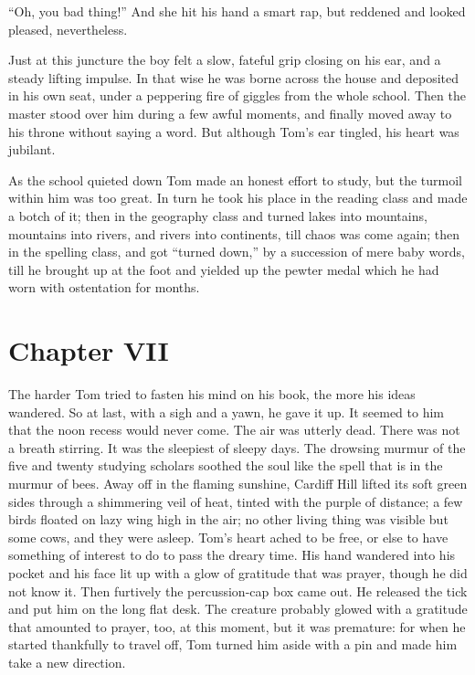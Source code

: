 \documentclass{book}
\begin{document}
“Oh, you bad thing!” And she hit his hand a smart rap, but reddened and looked pleased, nevertheless.

Just at this juncture the boy felt a slow, fateful grip closing on his ear, and a steady lifting impulse. In that wise he was borne across the house and deposited in his own seat, under a peppering fire of giggles from the whole school. Then the master stood over him during a few awful moments, and finally moved away to his throne without saying a word. But although Tom’s ear tingled, his heart was jubilant.

As the school quieted down Tom made an honest effort to study, but the turmoil within him was too great. In turn he took his place in the reading class and made a botch of it; then in the geography class and turned lakes into mountains, mountains into rivers, and rivers into continents, till chaos was come again; then in the spelling class, and got “turned down,” by a succession of mere baby words, till he brought up at the foot and yielded up the pewter medal which he had worn with ostentation for months.

\chapter*{Chapter VII}

The harder Tom tried to fasten his mind on his book, the more his ideas wandered. So at last, with a sigh and a yawn, he gave it up. It seemed to him that the noon recess would never come. The air was utterly dead. There was not a breath stirring. It was the sleepiest of sleepy days. The drowsing murmur of the five and twenty studying scholars soothed the soul like the spell that is in the murmur of bees. Away off in the flaming sunshine, Cardiff Hill lifted its soft green sides through a shimmering veil of heat, tinted with the purple of distance; a few birds floated on lazy wing high in the air; no other living thing was visible but some cows, and they were asleep. Tom’s heart ached to be free, or else to have something of interest to do to pass the dreary time. His hand wandered into his pocket and his face lit up with a glow of gratitude that was prayer, though he did not know it. Then furtively the percussion-cap box came out. He released the tick and put him on the long flat desk. The creature probably glowed with a gratitude that amounted to prayer, too, at this moment, but it was premature: for when he started thankfully to travel off, Tom turned him aside with a pin and made him take a new direction.
\end{document}
